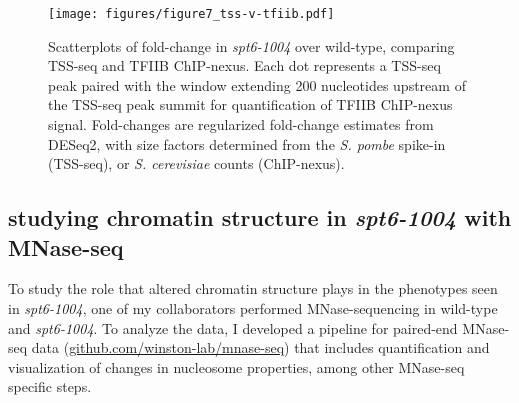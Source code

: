 \documentclass[9pt, letterpaper]{article}
\begin{document}

\begin{figure}[h]
\centering
\texttt{[image: figures/figure7\_tss-v-tfiib.pdf]}
\caption{Scatterplots of fold-change in \textit{spt6-1004} over wild-type, comparing TSS-seq and TFIIB ChIP-nexus. Each dot represents a TSS-seq peak paired with the window extending 200 nucleotides upstream of the TSS-seq peak summit for quantification of TFIIB ChIP-nexus signal. Fold-changes are regularized fold-change estimates from DESeq2, with size factors determined from the \textit{S. pombe} spike-in (TSS-seq), or \textit{S. cerevisiae} counts (ChIP-nexus).}
\end{figure}

\subsection{studying chromatin structure in \textit{spt6-1004} with MNase-seq}

To study the role that altered chromatin structure plays in the phenotypes seen in \textit{spt6-1004}, one of my collaborators performed MNase-sequencing in wild-type and \textit{spt6-1004}. To analyze the data, I developed a pipeline for paired-end MNase-seq data (\href{https://github.com/winston-lab/mnase-seq}{github.com/winston-lab/mnase-seq}) that includes quantification and visualization of changes in nucleosome properties, among other MNase-seq specific steps.
\end{document}
